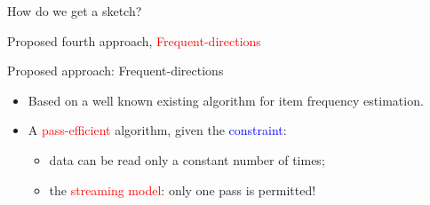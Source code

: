 \documentclass[first=dgreen,second=purple,logo=redque]{aaltoslides}
\newcommand{\vectornorm}[1]{\left\|#1\right\|}
\begin{document}
\begin{frame}[allowframebreaks=1]{How do we get a sketch?}
%  
%

Proposed fourth approach, \textcolor{red}{Frequent-directions}
\end{frame}

\begin{frame}[allowframebreaks=1]{Proposed approach: Frequent-directions}
\begin{itemize}
	\item Based on a well known existing algorithm for item frequency estimation.
	\item A \textcolor{red}{pass-efficient} algorithm, given the \textcolor{blue}{constraint}:
		\begin{itemize}
			\item data can be read only a \textcolor{dgreen}{constant} number of times;
			\item the \textcolor{red}{streaming model}: \textcolor{dgreen}{only one} pass is permitted!
		\end{itemize}


\end{itemize}
\end{frame}
\end{document}
